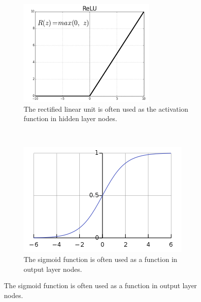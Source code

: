 \documentclass[12pt]{article}
\begin{document}
\begin{figure}[t!]
	\centering
	\begin{subfigure}[t]{0.5\textwidth}
		\centering
		\includegraphics[width=\linewidth]{relu.png}
		\caption{The rectified linear unit is often used as the activation function in hidden layer nodes.}
		\label{relu}
	\end{subfigure}%
	~ 
	\begin{subfigure}[t]{0.5\textwidth}
		\centering
		\includegraphics[width=\linewidth]{sigmoid.png}
		\caption{The sigmoid function is often used as a function in output layer nodes.}
		\label{sigmoid}
		
	\end{subfigure}

	\label{sigrelu}
\end{figure}
\end{document}

